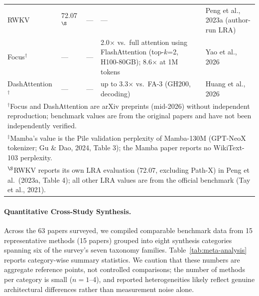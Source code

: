 \documentclass[10pt,twocolumn]{article}
\begin{document}
\begin{table}[!tbp]
\begin{tabular}{p{2.1cm}p{1.4cm}p{1.5cm}p{3.4cm}p{1.8cm}}
RWKV & 72.07$^\S$ & --- & --- & Peng et al., 2023a (author-run LRA) \\
Focus$^\dagger$ & --- & --- & 2.0$\times$ vs.\ full attention using FlashAttention (top-$k$=2, H100-80GB); 8.6$\times$ at 1M tokens & Yao et al., 2026 \\
DashAttention$^\dagger$ & --- & --- & up to 3.3$\times$ vs.\ FA-3 (GH200, decoding) & Huang et al., 2026 \\
\bottomrule
\multicolumn{5}{p{13cm}}{\scriptsize $^\dagger$Focus and DashAttention are arXiv preprints (mid-2026) without independent reproduction; benchmark values are from the original papers and have not been independently verified.}\\
\multicolumn{5}{p{13cm}}{\scriptsize $^\ddagger$Mamba's value is the Pile validation perplexity of Mamba-130M (GPT-NeoX tokenizer; Gu \& Dao, 2024, Table 3); the Mamba paper reports no WikiText-103 perplexity.}\\
\multicolumn{5}{p{13cm}}{\scriptsize $^\S$RWKV reports its own LRA evaluation (72.07, excluding Path-X) in Peng et al.\ (2023a, Table 4); all other LRA values are from the official benchmark (Tay et al., 2021).}\\
\end{tabular}
\end{table}

\paragraph{Quantitative Cross-Study Synthesis.}
Across the 63 papers surveyed, we compiled comparable benchmark data from 15 representative methods (15 papers) grouped into eight synthesis categories spanning six of the survey's seven taxonomy families. Table~\ref{tab:meta-analysis} reports category-wise summary statistics. We caution that these numbers are aggregate reference points, not controlled comparisons; the number of methods per category is small ($n = 1$--4), and reported heterogeneities likely reflect genuine architectural differences rather than measurement noise alone.
\end{document}
